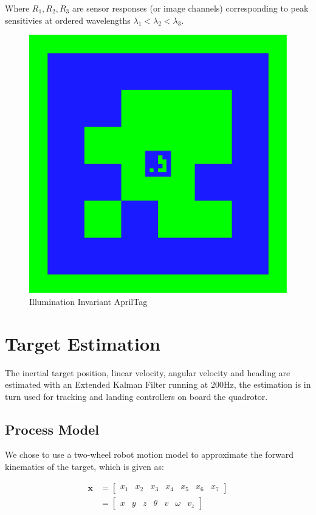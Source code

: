 \documentclass[letterpaper, 10 pt, conference]{ieeeconf}
\begin{document}
Where $R_{1}, R_{2}, R_{3}$ are sensor responses (or image channels)
corresponding to peak sensitivies at ordered wavelengths $\lambda_{1}
< \lambda_{2} < \lambda_{3}$.


\begin{figure}
\label{fig:apriltag_illumination_invariant}
  \includegraphics[width=\linewidth]{images/apriltag_illumination_invariant}
  \caption{Illumination Invariant AprilTag}
\end{figure}


\section{Target Estimation}
The inertial target position, linear velocity, angular velocity and
heading are estimated with an Extended Kalman Filter running at 200Hz, the
estimation is in turn used for tracking and landing controllers on board
the quadrotor.

\subsection{Process Model}
We chose to use a two-wheel robot motion model to approximate the forward
kinematics of the target, which is given as:

\begin{equation}
    \begin{split}
        \textbf{x}
        &= \begin{bmatrix}
            x_{1} & x_{2} & x_{3} & x_{4} & x_{5} & x_{6} & x_{7}
        \end{bmatrix} \\
        &=
        \begin{bmatrix}
            x & y & z & \theta & v & \omega & v_{z}
        \end{bmatrix}
    \end{split}
\end{equation}
\end{document}
